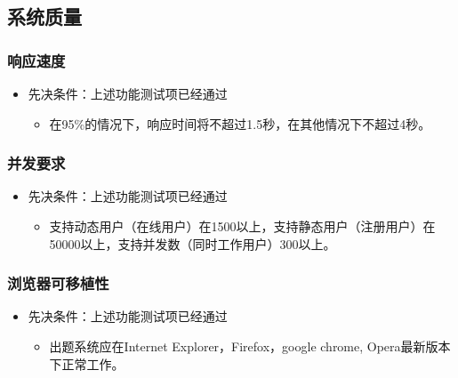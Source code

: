 \documentclass[hyperref, a4paper]{ctexart}
\providecommand{\tightlist}{%
  \setlength{\itemsep}{0pt}\setlength{\parskip}{0pt}}
\begin{document}
\hypertarget{ux7cfbux7edfux8d28ux91cf}{%
\subsection{系统质量}\label{ux7cfbux7edfux8d28ux91cf}}

\hypertarget{ux54cdux5e94ux901fux5ea6}{%
\subsubsection{响应速度}\label{ux54cdux5e94ux901fux5ea6}}

\begin{itemize}
\tightlist
\item
  先决条件：上述功能测试项已经通过

  \begin{itemize}
  \tightlist
  \item
    在95\%的情况下，响应时间将不超过1.5秒，在其他情况下不超过4秒。
  \end{itemize}
\end{itemize}

\hypertarget{ux5e76ux53d1ux8981ux6c42}{%
\subsubsection{并发要求}\label{ux5e76ux53d1ux8981ux6c42}}

\begin{itemize}
\tightlist
\item
  先决条件：上述功能测试项已经通过

  \begin{itemize}
  \tightlist
  \item
    支持动态用户（在线用户）在1500以上，支持静态用户（注册用户）在50000以上，支持并发数（同时工作用户）300以上。
  \end{itemize}
\end{itemize}

\hypertarget{ux6d4fux89c8ux5668ux53efux79fbux690dux6027}{%
\subsubsection{浏览器可移植性}\label{ux6d4fux89c8ux5668ux53efux79fbux690dux6027}}

\begin{itemize}
\tightlist
\item
  先决条件：上述功能测试项已经通过

  \begin{itemize}
  \tightlist
  \item
    出题系统应在Internet Explorer，Firefox，google chrome,
    Opera最新版本下正常工作。
  \end{itemize}
\end{itemize}
\end{document}
